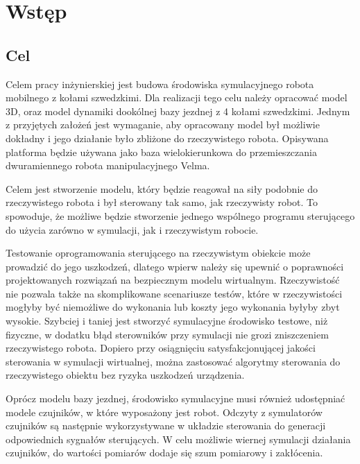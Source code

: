 \chapter{Wstęp}
	\section{Cel}
	Celem pracy inżynierskiej jest budowa środowiska symulacyjnego robota mobilnego z kołami szwedzkimi.
	Dla realizacji tego celu należy opracować model 3D, oraz model dynamiki dookólnej bazy jezdnej z 4 kołami szwedzkimi.
	Jednym z przyjętych założeń jest wymaganie, aby opracowany model był możliwie dokładny i jego działanie było zbliżone do rzeczywistego robota.
	Opisywana platforma będzie używana jako baza wielokierunkowa do przemieszczania dwuramiennego robota manipulacyjnego Velma.

	Celem jest stworzenie modelu, który będzie reagował na siły podobnie do rzeczywistego robota i był sterowany tak samo, jak rzeczywisty robot.
	To spowoduje, że możliwe będzie stworzenie jednego wspólnego programu sterującego do użycia zarówno w symulacji, jak i rzeczywistym robocie.

	Testowanie oprogramowania sterującego na rzeczywistym obiekcie może prowadzić do jego uszkodzeń, 
	dlatego wpierw należy się upewnić o poprawności projektowanych rozwiązań na bezpiecznym modelu wirtualnym.
	Rzeczywistość nie pozwala także na skomplikowane scenariusze testów, które w rzeczywistości mogłyby być niemożliwe do wykonania lub koszty jego wykonania byłyby zbyt wysokie.
	Szybciej i taniej jest stworzyć symulacyjne środowisko testowe, niż fizyczne, w dodatku błąd sterowników przy symulacji nie grozi zniszczeniem rzeczywistego robota.
	Dopiero przy osiągnięciu satysfakcjonującej jakości sterowania w symulacji wirtualnej, 
	można zastosować algorytmy sterowania do rzeczywistego obiektu bez ryzyka uszkodzeń urządzenia.

	Oprócz modelu bazy jezdnej, środowisko symulacyjne musi również udostępniać modele czujników, w które wyposażony jest robot. 
	Odczyty z symulatorów czujników są następnie wykorzystywane w układzie sterowania do generacji odpowiednich sygnałów sterujących.
	W celu możliwie wiernej symulacji działania czujników, do wartości pomiarów dodaje się szum pomiarowy i zakłócenia.


